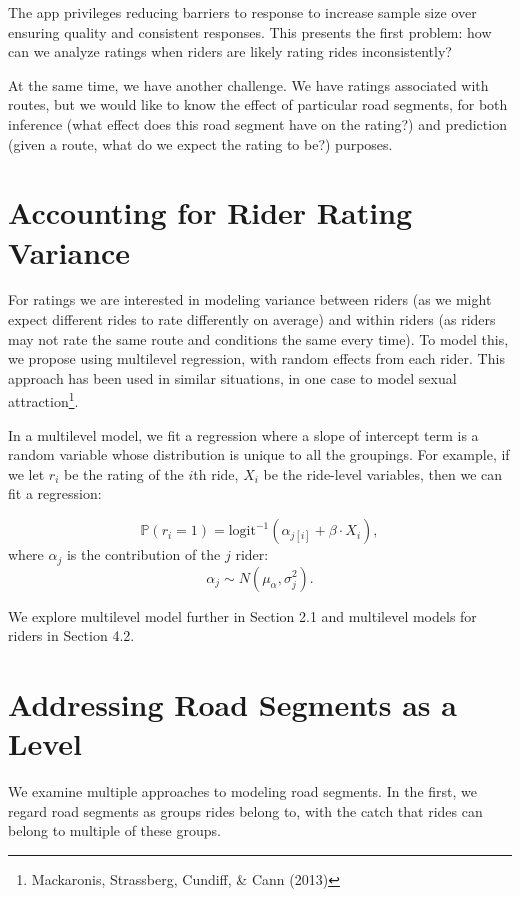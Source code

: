 \documentclass[12pt,twoside]{reedthesis}
\begin{document}
  The app privileges reducing barriers to response to increase sample size
  over ensuring quality and consistent responses. This presents the first
  problem: how can we analyze ratings when riders are likely rating rides
  inconsistently?
  
  At the same time, we have another challenge. We have ratings associated
  with routes, but we would like to know the effect of particular road
  segments, for both inference (what effect does this road segment have on
  the rating?) and prediction (given a route, what do we expect the rating
  to be?) purposes.
  
  \section{Accounting for Rider Rating
  Variance}\label{accounting-for-rider-rating-variance}
  
  For ratings we are interested in modeling variance between riders (as we
  might expect different rides to rate differently on average) and within
  riders (as riders may not rate the same route and conditions the same
  every time). To model this, we propose using multilevel regression, with
  random effects from each rider. This approach has been used in similar
  situations, in one case to model sexual attraction\footnote{Mackaronis,
    Strassberg, Cundiff, \& Cann (2013)}.
  
  In a multilevel model, we fit a regression where a slope of intercept
  term is a random variable whose distribution is unique to all the
  groupings. For example, if we let \(r_i\) be the rating of the \(i\)th
  ride, \(X_i\) be the ride-level variables, then we can fit a regression:
  
  \[\mathbb{P}(r_i = 1) = \text{logit}^{-1} 
  \left( \alpha_{j[i]} + \beta \cdot X_i \right) ,\] where \(\alpha_j\) is
  the contribution of the \(j\) rider:
  \[\alpha_j \sim N (\mu_\alpha, \sigma^2_j).\]
  
  We explore multilevel model further in Section 2.1 and multilevel models
  for riders in Section 4.2.
  
  \section{Addressing Road Segments as a
  Level}\label{addressing-road-segments-as-a-level}
  
  We examine multiple approaches to modeling road segments. In the first,
  we regard road segments as groups rides belong to, with the catch that
  rides can belong to multiple of these groups.
  
\end{document}
